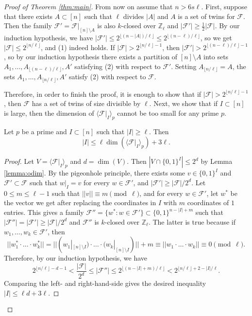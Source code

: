 \begin{proof}[Proof of Theorem \ref{thm:main}]
	    From now on assume that $n>6s\ell$. First, suppose that there exists $A\subset [n]$ such that $\ell$ divides $|A|$ and $A$ is a set of twins for $\mathcal{F}$. Then the family $\mathcal{F}'=\mathcal{F}|_{[n]\setminus A}$ is also $k$-closed over $\mathbb{Z}_{\ell}$ and $|\mathcal{F}'|\geq \frac{1}{2}|\mathcal{F}|$. By our induction hypothesis, we have $|\mathcal{F}'|\leq 2^{\lfloor (n-|A|)/\ell\rfloor}\leq 2^{\lfloor (n-\ell)/\ell\rfloor}$, so we get $|\mathcal{F}|\leq 2^{\lfloor n/\ell\rfloor}$, and (1) indeed holds. If $|\mathcal{F}|> 2^{\lfloor n/\ell\rfloor-1}$, then $|\mathcal{F}'|>2^{\lfloor (n-\ell)/\ell\rfloor-1}$, so by our induction hypothesis there exists a partition of $[n]\setminus A$ into sets $A_{1},\dots,A_{\lfloor (n-\ell)/\ell\rfloor},A'$ satisfying (2) with respect to $\mathcal{F}'$. Setting $A_{\lfloor n/\ell\rfloor}=A$, the sets  $A_{1},\dots,A_{\lfloor n/\ell\rfloor},A'$ satisfy (2) with respect to $\mathcal{F}$.
		
		Therefore, in order to finish the proof, it is enough to show that if $|\mathcal{F}|>2^{\lfloor n/\ell\rfloor-1}$, then $\mathcal{F}$ has a set of twins of size divisible by $\ell$. Next, we show that if $I\subset [n]$ is large, then the dimension of $\langle \mathcal{F}|_{I}\rangle_p$ cannot be too small for any prime $p$.
		
		\begin{claim}\label{claim:coordinates}
			Let $p$ be a prime and $I\subset [n]$ such that $|I|\geq \ell$. Then 
			$$|I|\leq \ell\dim(\langle \mathcal{F}|_I\rangle_{p})+3\ell.$$
		\end{claim}
		
		\begin{proof}
			Let $V=\langle \mathcal{F}|_{I}\rangle_p$ and $d = \dim(V)$. Then $|V\cap \{0,1\}^{I}|\leq 2^{d}$ by Lemma \ref{lemma:odim}. By the pigeonhole principle, there exists some $v\in \{0,1\}^{I}$ and $\mathcal{F}'\subset \mathcal{F}$ such that $w|_{I}=v$ for every $w\in\mathcal{F}'$, and $|\mathcal{F}'|\geq |\mathcal{F}|/2^{d}$. Let $0\leq m\leq \ell-1$ such that $||v||\equiv m \pmod \ell$, and for every $w\in \mathcal{F}'$, let $w^{*}$ be the vector we get after replacing the coordinates in $I$ with $m$ coordinates of $1$ entries. This gives a family $\mathcal{F}''=\{w^{*}:w\in\mathcal{F}'\}\subset \{0,1\}^{n-|I|+m}$ such that $|\mathcal{F}''|=|\mathcal{F}'|\geq |\mathcal{F}|/2^{d}$ and $\mathcal{F}''$ is $k$-closed over $\mathbb{Z}_{\ell}$. The latter is true because if $w_1,\dots,w_k\in\mathcal{F}'$, \nolinebreak then  
			$$||w_1^{*}\cdot\dotsc \cdot w_{k}^{*}||=||(w_1|_{[n]\setminus I})\cdot\dotsc\cdot (w_{k}|_{[n]\setminus I})||+m\equiv||w_1\cdot\dotsc\cdot w_{k}||\equiv 0 \pmod \ell .$$
			Therefore, by our induction hypothesis, we have
			$$2^{\lfloor n/\ell\rfloor-d-1}<\frac{|\mathcal{F}|}{2^{d}}\leq |\mathcal{F}''|\leq 2^{\lfloor (n-|I|+m)/\ell\rfloor}< 2^{\lfloor n/\ell\rfloor+2-|I|/\ell}.$$
			Comparing the left- and right-hand-side gives the desired inequality $|I|\leq \ell d+3\ell$. 
		\end{proof}	
		

\end{proof}

